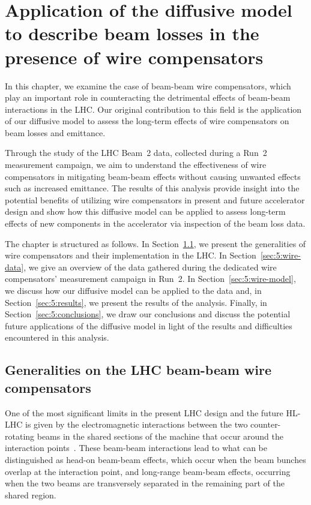 \chapter{Application of the diffusive model to describe beam losses in the presence of wire compensators}\label{ch:wire-compensators}

In this chapter, we examine the case of beam-beam wire compensators, which play an important role in counteracting the detrimental effects of beam-beam interactions in the LHC. Our original contribution to this field is the application of our diffusive model to assess the long-term effects of wire compensators on beam losses and emittance.

Through the study of the LHC Beam~2 data, collected during a Run~2 measurement campaign, we aim to understand the effectiveness of wire compensators in mitigating beam-beam effects without causing unwanted effects such as increased emittance. The results of this analysis provide insight into the potential benefits of utilizing wire compensators in present and future accelerator design and show how this diffusive model can be applied to assess long-term effects of new components in the accelerator via inspection of the beam loss data.

The chapter is structured as follows. In Section~\ref{sec:5:wire-compensators}, we present the generalities of wire compensators and their implementation in the LHC. In Section~\ref{sec:5:wire-data}, we give an overview of the data gathered during the dedicated wire compensators' measurement campaign in Run~2. In Section~\ref{sec:5:wire-model}, we discuss how our diffusive model can be applied to the data and, in Section~\ref{sec:5:results}, we present the results of the analysis. Finally, in Section~\ref{sec:5:conclusions}, we draw our conclusions and discuss the potential future applications of the diffusive model in light of the results and difficulties encountered in this analysis.

\section{Generalities on the LHC beam-beam wire compensators}\label{sec:5:wire-compensators}

One of the most significant limits in the present LHC design and the future HL-LHC is given by the electromagnetic interactions between the two counter-rotating beams in the shared sections of the machine that occur around the interaction points~\cite{Arduini_2016}. These beam-beam interactions lead to what can be distinguished as head-on beam-beam effects, which occur when the beam bunches overlap at the interaction point, and long-range beam-beam effects, occurring when the two beams are transversely separated in the remaining part of the shared region.

